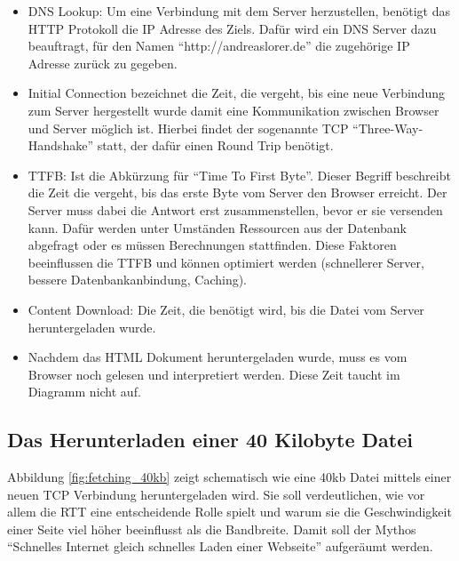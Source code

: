 			\begin{itemize}
				\item DNS Lookup: Um eine Verbindung mit dem Server herzustellen, benötigt das HTTP Protokoll die IP Adresse des Ziels. Dafür wird ein DNS Server dazu beauftragt, für den Namen "`http://andreaslorer.de"' die zugehörige IP Adresse zurück zu gegeben.

				\item Initial Connection bezeichnet die Zeit, die vergeht, bis eine neue Verbindung zum Server hergestellt wurde damit eine Kommunikation zwischen Browser und Server möglich ist. Hierbei findet der sogenannte TCP "`Three-Way-Handshake"' statt, der dafür einen Round Trip benötigt.

				\item TTFB: Ist die Abkürzung für "`Time To First Byte"'. Dieser Begriff beschreibt die Zeit die vergeht, bis das erste Byte vom Server den Browser erreicht. Der Server muss dabei die Antwort erst zusammenstellen, bevor er sie versenden kann. Dafür werden unter Umständen Ressourcen aus der Datenbank abgefragt oder es müssen Berechnungen stattfinden. Diese Faktoren beeinflussen die TTFB und können optimiert werden (schnellerer Server, bessere Datenbankanbindung, Caching).

				\item Content Download: Die Zeit, die benötigt wird, bis die Datei vom Server heruntergeladen wurde.

				\item Nachdem das HTML Dokument heruntergeladen wurde, muss es vom Browser noch gelesen und interpretiert werden. Diese Zeit taucht im Diagramm nicht auf.
			\end{itemize}
					

	\subsection{Das Herunterladen einer 40 Kilobyte Datei} %
	\label{sub:das_herunterladen_einer_40_kb_datei}
		Abbildung \ref{fig:fetching_40kb} zeigt schematisch wie eine 40kb Datei mittels einer neuen TCP Verbindung heruntergeladen wird. Sie soll verdeutlichen, wie vor allem die RTT eine entscheidende Rolle spielt und warum sie die Geschwindigkeit einer Seite viel höher beeinflusst als die Bandbreite. Damit soll der Mythos "`Schnelles Internet gleich schnelles Laden einer Webseite"' aufgeräumt werden.

